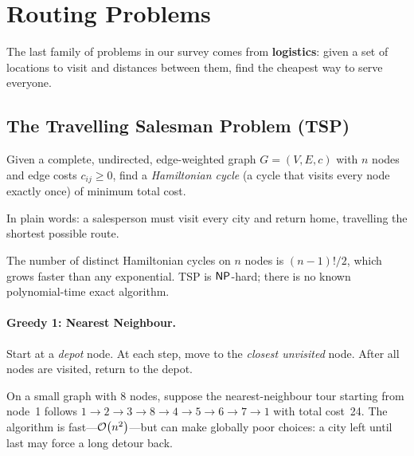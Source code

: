 
\section{Routing Problems}
\label{sec:routing}

The last family of problems in our survey comes from
\textbf{logistics}: given a set of locations to visit and
distances between them, find the cheapest way to serve everyone.%

\subsection{The Travelling Salesman Problem (TSP)}
\label{ssec:tsp}

\begin{definition}
\label{def:tsp}
Given a complete, undirected, edge-weighted graph
$G = (V, E, c)$ with $n$ nodes and edge costs $c_{ij} \ge 0$,
find a \emph{Hamiltonian cycle} (a cycle that visits every node
exactly once) of minimum total cost.
\end{definition}

In plain words: a salesperson must visit every city and return
home, travelling the shortest possible route.%

The number of distinct Hamiltonian cycles on $n$ nodes is
$(n-1)!/2$, which grows faster than any exponential.
TSP is $\mathsf{NP}$-hard; there is no known polynomial-time exact
algorithm.

\paragraph{Greedy 1: Nearest Neighbour.}
Start at a \emph{depot} node.
At each step, move to the \emph{closest unvisited} node.
After all nodes are visited, return to the depot.

\begin{example}
\label{ex:nn-tsp}
On a small graph with 8 nodes, suppose the nearest-neighbour
tour starting from node~1 follows
$1 \to 2 \to 3 \to 8 \to 4 \to 5 \to 6 \to 7 \to 1$
with total cost~24.  The algorithm is fast---$\mathcal{O}\!\left(n^2\right)$---but
can make globally poor choices: a city left until last may
force a long detour back.
\end{example}

